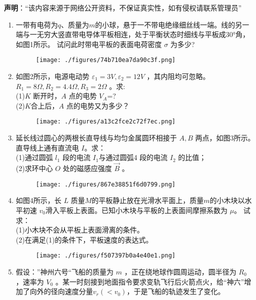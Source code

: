 
\textbf{声明}：“该内容来源于网络公开资料，不保证真实性，如有侵权请联系管理员”


\begin{enumerate}
\item 一带有电荷为$q$、质量为$m$的小球，悬于一不带电绝缘细丝线一端。线的另一端与一无穷大竖直带电导体平板相连，处于平衡状态时细线与平板成$30$°角，如图1所示。 试问此时带电平板的表面电荷密度 $\sigma$ 为多少?
\begin{figure}[ht]
\centering
\texttt{[image: ./figures/74b710ea7da90c3f.png]}
\caption{} \label{fig_ZKYP06_1}
\end{figure}
\item 如图2所示，电源电动势  $\varepsilon_1=3V,\varepsilon_2=12V$ ，其内阻均可忽略。 $R_1=8\Omega,R_2=4.4\Omega,R_3=2\Omega$  。求:\\
(1)$K$ 断开时，$A$  点的电势  $V_A$=?\\
(2)$K$合上后，$A$  点的电势又为多少？
\begin{figure}[ht]
\centering
\texttt{[image: ./figures/a13c2fce2c72f7ec.png]}
\caption{} \label{fig_ZKYP06_2}
\end{figure}
\item 延长线过圆心的两根长直导线与均匀金属圆环相接于 $A,B $ 两点，如图3所示。直导线上通有直流电 $I$。求：\\
(1)通过圆弧 $l_1$ 段的电流 $I_1 $与通过圆弧4 段的电流 $I_2$ 的比值；\\
(2)求环中心 $O$ 处的磁感应强度 $\vec B$ 。
\begin{figure}[ht]
\centering
\texttt{[image: ./figures/867e38851f6d0799.png]}
\caption{} \label{fig_ZKYP06_3}
\end{figure}
\item 如图4所示，长 $L$ 质量$M$的平板静止放在光滑水平面上，质量$m$的小木块以水平初速 $v_0$滑入平板上表面。已知小木块与平板的上表面间摩擦系数为 $\mu $。 试求：\\
(1)小木块不会从平板上表面滑离的条件。\\
(2)在满足(1)的条件下，平板速度的表达式。
\begin{figure}[ht]
\centering
\texttt{[image: ./figures/f507397b0a4e40e1.png]}
\caption{} \label{fig_ZKYP06_4}
\end{figure}
\item 假设：”神州六号“飞船的质量为 $m$ ，正在绕地球作圆周运动，圆半径为 $R_0$ ，速率为 $V_0$ 。某一时刻接到地面指令要求变轨飞行后火箭点火，给“神六”增加了向外的径向速度分量$v_r(<v_0)$，于是飞船的轨迹发生了变化。\\

\end{enumerate}
